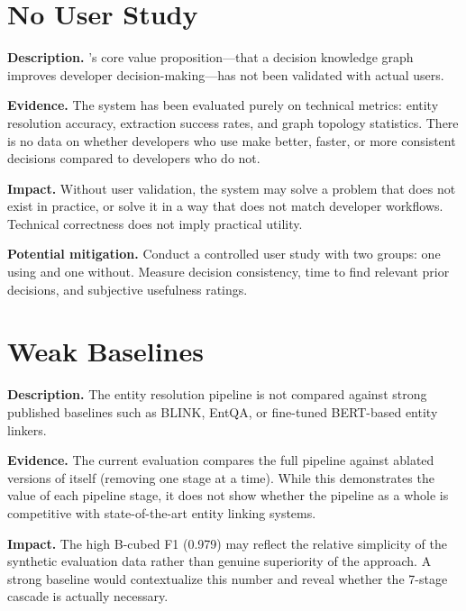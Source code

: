 \section{No User Study}
\label{sec:lim-no-user-study}

\noindent\textbf{Description.}
\sysname{}'s core value proposition---that a decision knowledge graph
improves developer decision-making---has not been validated with actual
users.

\medskip\noindent\textbf{Evidence.}
The system has been evaluated purely on technical metrics: entity
resolution accuracy, extraction success rates, and graph topology
statistics.  There is no data on whether developers who use \sysname{}
make better, faster, or more consistent decisions compared to developers
who do not.

\medskip\noindent\textbf{Impact.}
Without user validation, the system may solve a problem that does not
exist in practice, or solve it in a way that does not match developer
workflows.  Technical correctness does not imply practical utility.

\medskip\noindent\textbf{Potential mitigation.}
Conduct a controlled user study with two groups: one using \sysname{} and
one without.  Measure decision consistency, time to find relevant prior
decisions, and subjective usefulness ratings.


\section{Weak Baselines}
\label{sec:lim-weak-baselines}

\noindent\textbf{Description.}
The entity resolution pipeline is not compared against strong published
baselines such as BLINK, EntQA, or fine-tuned BERT-based entity linkers.

\medskip\noindent\textbf{Evidence.}
The current evaluation compares the full pipeline against ablated versions
of itself (removing one stage at a time).  While this demonstrates the
value of each pipeline stage, it does not show whether the pipeline as a
whole is competitive with state-of-the-art entity linking systems.

\medskip\noindent\textbf{Impact.}
The high B-cubed F1 (0.979) may reflect the relative simplicity of the
synthetic evaluation data rather than genuine superiority of the approach.
A strong baseline would contextualize this number and reveal whether the
7-stage cascade is actually necessary.


